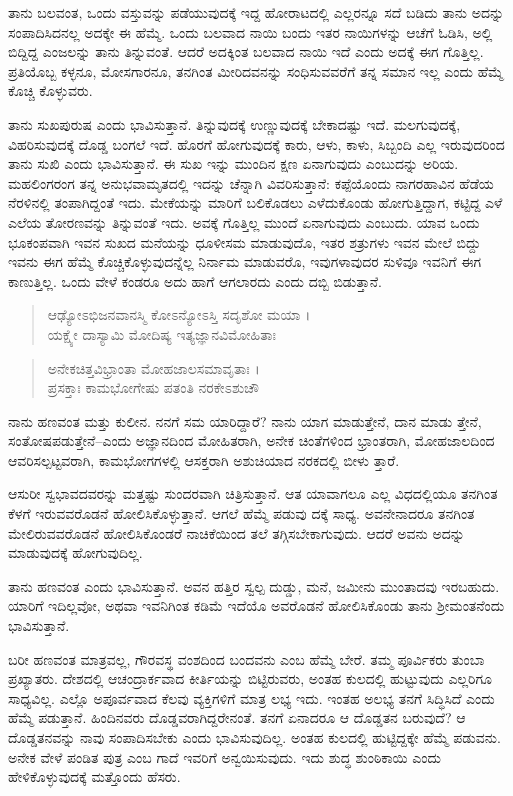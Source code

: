 ತಾನು ಬಲವಂತ, ಒಂದು ವಸ್ತುವನ್ನು ಪಡೆಯುವುದಕ್ಕೆ ಇದ್ದ ಹೋರಾಟದಲ್ಲಿ ಎಲ್ಲರನ್ನೂ ಸದೆ ಬಡಿದು ತಾನು ಅದನ್ನು ಸಂಪಾದಿಸಿದನಲ್ಲ ಅದಕ್ಕೇ ಈ ಹೆಮ್ಮೆ. ಒಂದು ಬಲವಾದ ನಾಯಿ ಬಂದು ಇತರ ನಾಯಿಗಳನ್ನು ಆಚೆಗೆ ಓಡಿಸಿ, ಅಲ್ಲಿ ಬಿದ್ದಿದ್ದ ಎಂಜಲನ್ನು ತಾನು ತಿನ್ನುವಂತೆ. ಆದರೆ ಅದಕ್ಕಿಂತ ಬಲವಾದ ನಾಯಿ ಇದೆ ಎಂದು ಅದಕ್ಕೆ ಈಗ ಗೊತ್ತಿಲ್ಲ. ಪ್ರತಿಯೊಬ್ಬ ಕಳ್ಳನೂ, ಮೋಸಗಾರನೂ, ತನಗಿಂತ ಮೀರಿದವನನ್ನು ಸಂಧಿಸುವವರೆಗೆ ತನ್ನ ಸಮಾನ ಇಲ್ಲ ಎಂದು ಹೆಮ್ಮೆ ಕೊಚ್ಚಿ ಕೊಳ್ಳುವರು.

ತಾನು ಸುಖಪುರುಷ ಎಂದು ಭಾವಿಸುತ್ತಾನೆ. ತಿನ್ನುವುದಕ್ಕೆ ಉಣ್ಣುವುದಕ್ಕೆ ಬೇಕಾದಷ್ಟು ಇದೆ. ಮಲಗುವುದಕ್ಕೆ, ವಿಹರಿಸುವುದಕ್ಕೆ ದೊಡ್ಡ ಬಂಗಲೆ ಇದೆ. ಹೊರಗೆ ಹೋಗುವುದಕ್ಕೆ ಕಾರು, ಆಳು, ಕಾಳು, ಸಿಬ್ಬಂದಿ ಎಲ್ಲ ಇರುವುದರಿಂದ ತಾನು ಸುಖಿ ಎಂದು ಭಾವಿಸುತ್ತಾನೆ. ಈ ಸುಖ ಇನ್ನು ಮುಂದಿನ ಕ್ಷಣ ಏನಾಗುವುದು ಎಂಬುದನ್ನು ಅರಿಯ. ಮಹಲಿಂಗರಂಗ ತನ್ನ ಅನುಭವಾಮೃತದಲ್ಲಿ ಇದನ್ನು ಚೆನ್ನಾಗಿ ವಿವರಿಸುತ್ತಾನೆ: ಕಪ್ಪೆಯೊಂದು ನಾಗರಹಾವಿನ ಹೆಡೆಯ ನೆರಳಿನಲ್ಲಿ ತಂಪಾಗಿದ್ದಂತೆ ಇದು. ಮೇಕೆಯನ್ನು ಮಾರಿಗೆ ಬಲಿಕೊಡಲು ಎಳೆದುಕೊಂಡು ಹೋಗುತ್ತಿದ್ದಾಗ, ಕಟ್ಟಿದ್ದ ಎಳೆ ಎಲೆಯ ತೋರಣವನ್ನು ತಿನ್ನುವಂತೆ ಇದು. ಅವಕ್ಕೆ ಗೊತ್ತಿಲ್ಲ ಮುಂದೆ ಏನಾಗುವುದು ಎಂಬುದು. ಯಾವ ಒಂದು ಭೂಕಂಪವಾಗಿ ಇವನ ಸುಖದ ಮನೆಯನ್ನು ಧೂಳೀಸಮ ಮಾಡುವುದೊ, ಇತರ ಶತ್ರುಗಳು ಇವನ ಮೇಲೆ ಬಿದ್ದು ಇವನು ಈಗ ಹೆಮ್ಮೆ ಕೊಚ್ಚಿಕೊಳ್ಳುವುದನ್ನೆಲ್ಲ ನಿರ್ನಾಮ ಮಾಡುವರೊ, ಇವುಗಳಾವುದರ ಸುಳಿವೂ ಇವನಿಗೆ ಈಗ ಕಾಣುತ್ತಿಲ್ಲ. ಒಂದು ವೇಳೆ ಕಂಡರೂ ಅದು ಹಾಗೆ ಆಗಲಾರದು ಎಂದು ದಬ್ಬಿ ಬಿಡುತ್ತಾನೆ.

\begin{verse}
ಆಢ್ಯೋಽಭಿಜನವಾನಸ್ಮಿ ಕೋಽನ್ಯೋಽಸ್ತಿ ಸದೃಶೋ ಮಯಾ ।\\ಯಕ್ಷ್ಯೇ ದಾಸ್ಯಾಮಿ ಮೋದಿಷ್ಯ ಇತ್ಯಜ್ಞಾನವಿಮೋಹಿತಾಃ 
\end{verse}

\begin{verse}
ಅನೇಕಚಿತ್ತವಿಭ್ರಾಂತಾ ಮೋಹಜಾಲಸಮಾವೃತಾಃ ।\\ಪ್ರಸಕ್ತಾಃ ಕಾಮಭೋಗೇಷು ಪತಂತಿ ನರಕೇಽಶುಚೌ 
\end{verse}

{\small ನಾನು ಹಣವಂತ ಮತ್ತು ಕುಲೀನ. ನನಗೆ ಸಮ ಯಾರಿದ್ದಾರೆ? ನಾನು ಯಾಗ ಮಾಡುತ್ತೇನೆ, ದಾನ ಮಾಡು ತ್ತೇನೆ, ಸಂತೋಷಪಡುತ್ತೇನೆ–ಎಂದು ಅಜ್ಞಾನದಿಂದ ಮೋಹಿತರಾಗಿ, ಅನೇಕ ಚಿಂತೆಗಳಿಂದ ಭ್ರಾಂತರಾಗಿ, ಮೋಹಜಾಲದಿಂದ ಆವರಿಸಲ್ಪಟ್ಟವರಾಗಿ, ಕಾಮಭೋಗಗಳಲ್ಲಿ ಆಸಕ್ತರಾಗಿ ಅಶುಚಿಯಾದ ನರಕದಲ್ಲಿ ಬೀಳು ತ್ತಾರೆ.}

ಆಸುರೀ ಸ್ವಭಾವದವರನ್ನು ಮತ್ತಷ್ಟು ಸುಂದರವಾಗಿ ಚಿತ್ರಿಸುತ್ತಾನೆ. ಆತ ಯಾವಾಗಲೂ ಎಲ್ಲ ವಿಧದಲ್ಲಿಯೂ ತನಗಿಂತ ಕೆಳಗೆ ಇರುವವರೊಡನೆ ಹೋಲಿಸಿಕೊಳ್ಳುತ್ತಾನೆ. ಆಗಲೆ ಹೆಮ್ಮೆ ಪಡುವು ದಕ್ಕೆ ಸಾಧ್ಯ. ಅವನೇನಾದರೂ ತನಗಿಂತ ಮೇಲಿರುವವರೊಡನೆ ಹೋಲಿಸಿಕೊಂಡರೆ ನಾಚಿಕೆಯಿಂದ ತಲೆ ತಗ್ಗಿಸಬೇಕಾಗುವುದು. ಆದರೆ ಅವನು ಅದನ್ನು ಮಾಡುವುದಕ್ಕೆ ಹೋಗುವುದಿಲ್ಲ.

ತಾನು ಹಣವಂತ ಎಂದು ಭಾವಿಸುತ್ತಾನೆ. ಅವನ ಹತ್ತಿರ ಸ್ವಲ್ಪ ದುಡ್ಡು, ಮನೆ, ಜಮೀನು ಮುಂತಾದವು ಇರಬಹುದು. ಯಾರಿಗೆ ಇದಿಲ್ಲವೋ, ಅಥವಾ ಇವನಿಗಿಂತ ಕಡಿಮೆ ಇದೆಯೊ ಅವರೊಡನೆ ಹೋಲಿಸಿಕೊಂಡು ತಾನು ಶ್ರೀಮಂತನೆಂದು ಭಾವಿಸುತ್ತಾನೆ.

ಬರೀ ಹಣವಂತ ಮಾತ್ರವಲ್ಲ, ಗೌರವಸ್ಥ ವಂಶದಿಂದ ಬಂದವನು ಎಂಬ ಹೆಮ್ಮೆ ಬೇರೆ. ತಮ್ಮ ಪೂರ್ವಿಕರು ತುಂಬಾ ಪ್ರಖ್ಯಾತರು. ದೇಶದಲ್ಲಿ ಆಚಂದ್ರಾರ್ಕವಾದ ಕೀರ್ತಿಯನ್ನು ಬಿಟ್ಟಿರುವರು, ಅಂತಹ ಕುಲದಲ್ಲಿ ಹುಟ್ಟುವುದು ಎಲ್ಲರಿಗೂ ಸಾಧ್ಯವಿಲ್ಲ. ಎಲ್ಲೊ ಅಪೂರ್ವವಾದ ಕೆಲವು ವ್ಯಕ್ತಿಗಳಿಗೆ ಮಾತ್ರ ಲಭ್ಯ ಇದು. ಇಂತಹ ಅಲಭ್ಯ ತನಗೆ ಸಿದ್ಧಿಸಿದೆ ಎಂದು ಹೆಮ್ಮೆ ಪಡುತ್ತಾನೆ. ಹಿಂದಿನವರು ದೊಡ್ಡವರಾಗಿದ್ದರೇನಂತೆ. ತನಗೆ ಏನಾದರೂ ಆ ದೊಡ್ಡತನ ಬರುವುದೆ? ಆ ದೊಡ್ಡತನವನ್ನು ನಾವು ಸಂಪಾದಿಸಬೇಕು ಎಂದು ಭಾವಿಸುವುದಿಲ್ಲ. ಅಂತಹ ಕುಲದಲ್ಲಿ ಹುಟ್ಟಿದ್ದಕ್ಕೇ ಹೆಮ್ಮೆ ಪಡುವನು. ಅನೇಕ ವೇಳೆ ಪಂಡಿತ ಪುತ್ರ ಎಂಬ ಗಾದೆ ಇವರಿಗೆ ಅನ್ವಯಿಸುವುದು. ಇದು ಶುದ್ಧ ಶುಂಠಿಕಾಯಿ ಎಂದು ಹೇಳಿಕೊಳ್ಳುವುದಕ್ಕೆ ಮತ್ತೊಂದು ಹೆಸರು.

